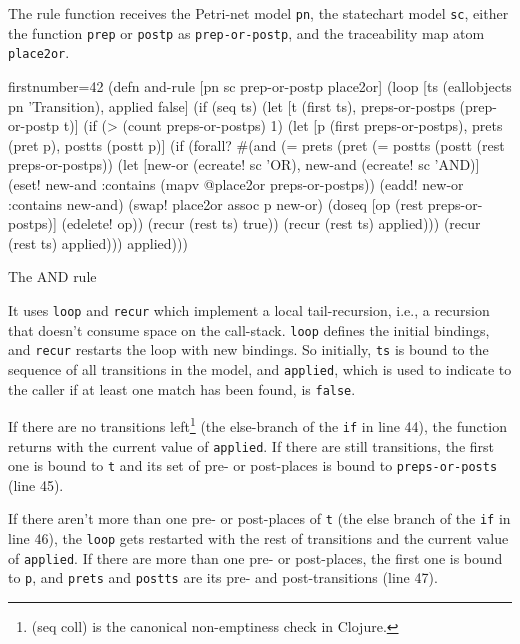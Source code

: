 \documentclass[11pt]{article}
\begin{document}
The rule function receives the Petri-net model \verb|pn|, the statechart model
\verb|sc|, either the function \verb|prep| or \verb|postp| as
\verb|prep-or-postp|, and the traceability map atom \verb|place2or|.

\begin{listing}[H]
  \begin{clojurecode*}{firstnumber=42}
(defn and-rule [pn sc prep-or-postp place2or]
  (loop [ts (eallobjects pn 'Transition), applied false]
    (if (seq ts)
      (let [t (first ts), preps-or-postps (prep-or-postp t)]
        (if (> (count preps-or-postps) 1)
          (let [p (first preps-or-postps), prets (pret p), postts (postt p)]
            (if (forall? #(and (= prets  (pret %
                               (= postts (postt %
                         (rest preps-or-postps))
              (let [new-or  (ecreate! sc 'OR), new-and (ecreate! sc 'AND)]
                (eset! new-and :contains (mapv @place2or preps-or-postps))
                (eadd! new-or  :contains new-and)
                (swap! place2or assoc p new-or)
                (doseq [op (rest preps-or-postps)]
                  (edelete! op))
                (recur (rest ts) true))
              (recur (rest ts) applied)))
          (recur (rest ts) applied)))
      applied)))
  \end{clojurecode*}
  \label{lst:and-rule}
  \caption{The AND rule}
\end{listing}

It uses \verb|loop| and \verb|recur| which implement a local tail-recursion,
i.e., a recursion that doesn't consume space on the call-stack.  \verb|loop|
defines the initial bindings, and \verb|recur| restarts the loop with new
bindings.  So initially, \verb|ts| is bound to the sequence of all transitions
in the model, and \verb|applied|, which is used to indicate to the caller if at
least one match has been found, is \verb|false|.

If there are no transitions left\footnote{\textsf{(seq coll) is the canonical
    non-emptiness check in Clojure.}} (the else-branch of the \verb|if| in line
44), the function returns with the current value of \verb|applied|.  If there
are still transitions, the first one is bound to \verb|t| and its set of pre-
or post-places is bound to \verb|preps-or-posts| (line 45).

If there aren't more than one pre- or post-places of \verb|t| (the else branch
of the \verb|if| in line 46), the \verb|loop| gets restarted with the rest of
transitions and the current value of \verb|applied|.  If there are more than
one pre- or post-places, the first one is bound to \verb|p|, and \verb|prets|
and \verb|postts| are its pre- and post-transitions (line 47).
\end{document}
